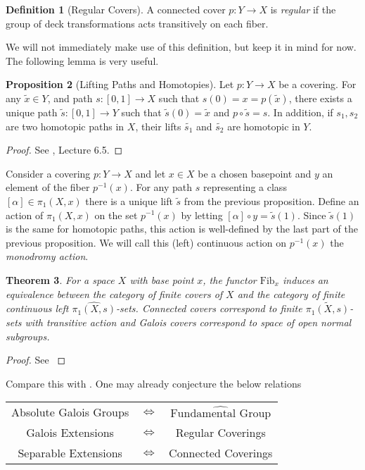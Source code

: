 \documentclass{article}
\newtheorem{theorem}{Theorem}[section]
\theoremstyle{definition}
\newtheorem{proposition}[theorem]{Proposition}
\newtheorem{definition}[theorem]{Definition}
\theoremstyle{remark}
\begin{document}
\begin{definition}[Regular Covers]
	A connected cover $p: Y \to X$ is \textit{regular} if the group of deck transformations acts transitively on each fiber.
\end{definition}

We will not immediately make use of this definition, but keep it in mind for now.
The following lemma is very useful.

\begin{proposition}[Lifting Paths and Homotopies]	
	Let $p: Y \to X$ be a covering. 
	For any $\widetilde{x} \in Y$, and path $s: [0,1] \to X$ such that $s(0) = x = p(\widetilde{x})$, there exists a unique path $\widetilde{s}:[0,1] \to Y$ such that $\widetilde{s}(0) = \widetilde{x}$ and $p \circ \widetilde{s} = s$.
	In addition, if $s_1, s_2$ are two homotopic paths in $X$, their lifts $\widetilde{s_1}$ and $\widetilde{s_2}$ are homotopic in $Y$.
\end{proposition}

\begin{proof}
	See \cite{FomenkoFuchs}, Lecture 6.5.
\end{proof}
		
Consider a covering $p: Y \to X$ and let $x \in X$ be a chosen basepoint and $y$ an element of the fiber $p^{-1}(x)$.
	For any path $s$ representing a class $[\alpha] \in \pi_1(X,x)$ there is a unique lift $\widetilde{s}$ from the previous proposition.
	Define an action of $\pi_1(X,x)$ on the set $p^{-1}(x)$ by letting $[\alpha] \circ y = \widetilde{s}(1)$.
	Since $\widetilde{s}(1)$ is the same for homotopic paths, this action is well-defined by the last part of the previous proposition.
	We will call this (left) continuous action on $p^{-1}(x)$ the \textit{monodromy action}.

	\begin{theorem}
	For a space $X$ with base point $x$, the functor $\text{Fib}_x$ induces an equivalence between the category of finite covers of $X$ and the category of finite continuous left $\widehat{\pi_1(X,s)}$-sets.
	Connected covers correspond to finite $\widetilde{\pi_1(X,s)}$-sets with transitive action and Galois covers correspond to space of open normal subgroups.
\end{theorem}
\begin{proof}
	See \cite{Szamuely}
\end{proof}

Compare this with .
One may already conjecture the below relations
\begin{center}
\begin{tabular}{ |c c c| } 
\hline
	Absolute Galois Groups & $\Longleftrightarrow$ & $\widehat{\text{Fundamental Group}}$ \\
 
	Galois Extensions & $\Longleftrightarrow$ & Regular Coverings\\
 
	Separable Extensions & $\Longleftrightarrow$ & Connected Coverings\\
 \hline
\end{tabular}
\end{center}
\end{document}

